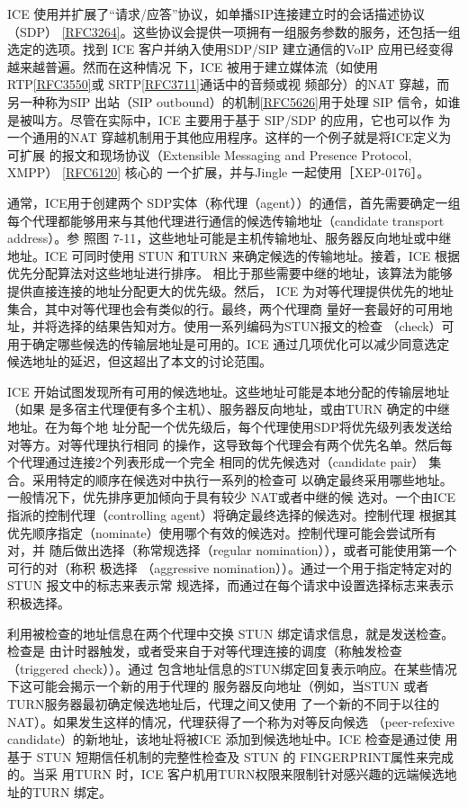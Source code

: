 ICE 使用并扩展了“请求/应答”协议，如单播SIP连接建立时的会话描述协议（SDP）
\href{https://www.rfc-editor.org/rfc/rfc3264}{[RFC3264]}。这些协议会提供一项拥有一组服务参数的服务，还包括一组选定的选项。找到
ICE 客户并纳入使用SDP/SIP 建立通信的VoIP 应用已经变得越来越普遍。然而在这种情况
下，ICE 被用于建立媒体流（如使用
RTP\href{https://www.rfc-editor.org/rfc/rfc3550}{[RFC3550]}或
SRTP\href{https://www.rfc-editor.org/rfc/rfc3711}{[RFC3711]}通话中的音频或视
频部分）的NAT 穿越，而另一种称为SIP 出站（SIP
outbound）的机制\href{https://www.rfc-editor.org/rfc/rfc5626}{[RFC5626]}用于处理
SIP 信令，如谁是被叫方。尽管在实际中，ICE 主要用于基于 SIP/SDP 的应用，它也可以作
为一个通用的NAT 穿越机制用于其他应用程序。这样的一个例子就是将ICE定义为可扩展
的报文和现场协议（Extensible Messaging and Presence Protocol, XMPP）
\href{https://www.rfc-editor.org/rfc/rfc6120}{[RFC6120]} 核心的
一个扩展，并与Jingle 一起使用［XEP-0176］。

通常，ICE用于创建两个 SDP实体（称代理（agent））的通信，首先需要确定一组
每个代理都能够用来与其他代理进行通信的候选传输地址（candidate transport address）。参
照图 7-11，这些地址可能是主机传输地址、服务器反向地址或中继地址。ICE 可同时使用
STUN 和TURN 来确定候选的传输地址。接着，ICE 根据优先分配算法对这些地址进行排序。
相比于那些需要中继的地址，该算法为能够提供直接连接的地址分配更大的优先级。然后，
ICE 为对等代理提供优先的地址集合，其中对等代理也会有类似的行。最终，两个代理商
量好一套最好的可用地址，并将选择的结果告知对方。使用一系列编码为STUN报文的检查
（check）可用于确定哪些候选的传输层地址是可用的。ICE 通过几项优化可以减少同意选定
候选地址的延迟，但这超出了本文的讨论范围。

ICE 开始试图发现所有可用的候选地址。这些地址可能是本地分配的传输层地址（如果
是多宿主代理便有多个主机）、服务器反向地址，或由TURN 确定的中继地址。在为每个地
址分配一个优先级后，每个代理使用SDP将优先级列表发送给对等方。对等代理执行相同
的操作，这导致每个代理会有两个优先名单。然后每个代理通过连接2个列表形成一个完全
相同的优先候选对（candidate pair） 集合。采用特定的顺序在候选对中执行一系列的检查可
以确定最终采用哪些地址。一般情况下，优先排序更加倾向于具有较少 NAT或者中继的候
选对。一个由ICE 指派的控制代理（controlling agent）将确定最终选择的候选对。控制代理
根据其优先顺序指定（nominate）使用哪个有效的候选对。控制代理可能会尝试所有对，并
随后做出选择（称常规选择（regular nomination）），或者可能使用第一个可行的对（称积
极选择 （aggressive nomination））。通过一个用于指定特定对的STUN 报文中的标志来表示常
规选择，而通过在每个请求中设置选择标志来表示积极选择。

利用被检查的地址信息在两个代理中交换 STUN 绑定请求信息，就是发送检查。检查是
由计时器触发，或者受来自于对等代理连接的调度（称触发检查（triggered check））。通过
包含地址信息的STUN绑定回复表示响应。在某些情况下这可能会揭示一个新的用于代理的
服务器反向地址（例如，当STUN 或者 TURN服务器最初确定候选地址后，代理之间又使用
了一个新的不同于以往的NAT）。如果发生这样的情况，代理获得了一个称为对等反向候选
（peer-refexive candidate）的新地址，该地址将被ICE 添加到候选地址中。ICE 检查是通过使
用基于 STUN 短期信任机制的完整性检查及 STUN 的 FINGERPRINT属性来完成的。当采
用TURN 时，ICE 客户机用TURN权限来限制针对感兴趣的远端候选地址的TURN 绑定。

